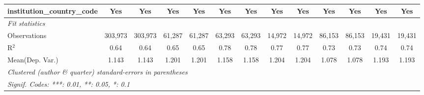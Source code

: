 \begin{tabular}{lcccccccccccc}
   institution\_country\_code               & Yes            & Yes            & Yes           & Yes          & Yes            & Yes            & Yes           & Yes           & Yes            & Yes            & Yes           & Yes\\  
   \midrule
   \emph{Fit statistics}\\
   Observations                             & 303,973        & 303,973        & 61,287        & 61,287       & 63,293         & 63,293         & 14,972        & 14,972        & 86,153         & 86,153         & 19,431        & 19,431\\  
   R$^2$                                    & 0.64           & 0.64           & 0.65          & 0.65         & 0.78           & 0.78           & 0.77          & 0.77          & 0.73           & 0.73           & 0.74          & 0.74\\  
Mean(Dep. Var.) & 1.143 & 1.143 & 1.201 & 1.201 & 1.158 & 1.158 & 1.204 & 1.204 & 1.078 & 1.078 & 1.193 & 1.193 \\
   \midrule \midrule
   \multicolumn{13}{l}{\emph{Clustered (author \& quarter) standard-errors in parentheses}}\\
   \multicolumn{13}{l}{\emph{Signif. Codes: ***: 0.01, **: 0.05, *: 0.1}}\\
\end{tabular}
\par\endgroup
